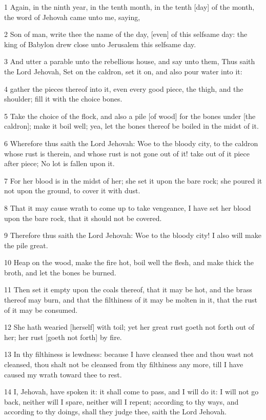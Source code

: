 \par 1 Again, in the ninth year, in the tenth month, in the tenth [day] of the month, the word of Jehovah came unto me, saying,
\par 2 Son of man, write thee the name of the day, [even] of this selfsame day: the king of Babylon drew close unto Jerusalem this selfsame day.
\par 3 And utter a parable unto the rebellious house, and say unto them, Thus saith the Lord Jehovah, Set on the caldron, set it on, and also pour water into it:
\par 4 gather the pieces thereof into it, even every good piece, the thigh, and the shoulder; fill it with the choice bones.
\par 5 Take the choice of the flock, and also a pile [of wood] for the bones under [the caldron]; make it boil well; yea, let the bones thereof be boiled in the midst of it.
\par 6 Wherefore thus saith the Lord Jehovah: Woe to the bloody city, to the caldron whose rust is therein, and whose rust is not gone out of it! take out of it piece after piece; No lot is fallen upon it.
\par 7 For her blood is in the midst of her; she set it upon the bare rock; she poured it not upon the ground, to cover it with dust.
\par 8 That it may cause wrath to come up to take vengeance, I have set her blood upon the bare rock, that it should not be covered.
\par 9 Therefore thus saith the Lord Jehovah: Woe to the bloody city! I also will make the pile great.
\par 10 Heap on the wood, make the fire hot, boil well the flesh, and make thick the broth, and let the bones be burned.
\par 11 Then set it empty upon the coals thereof, that it may be hot, and the brass thereof may burn, and that the filthiness of it may be molten in it, that the rust of it may be consumed.
\par 12 She hath wearied [herself] with toil; yet her great rust goeth not forth out of her; her rust [goeth not forth] by fire.
\par 13 In thy filthiness is lewdness: because I have cleansed thee and thou wast not cleansed, thou shalt not be cleansed from thy filthiness any more, till I have caused my wrath toward thee to rest.
\par 14 I, Jehovah, have spoken it: it shall come to pass, and I will do it: I will not go back, neither will I spare, neither will I repent; according to thy ways, and according to thy doings, shall they judge thee, saith the Lord Jehovah.
